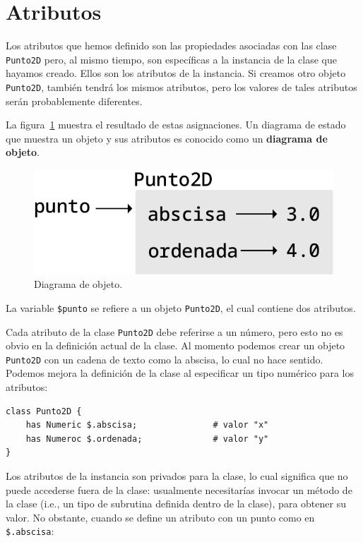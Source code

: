 \section{Atributos}
\label{attributes}

Los atributos que hemos definido son las propiedades asociadas
con las clase {\tt Punto2D} pero, al mismo tiempo, son específicas
a la instancia de la clase que hayamos creado. Ellos son los
atributos de la instancia. Si creamos otro objeto {\tt Punto2D},
también tendrá los mismos atributos, pero los valores de tales
atributos serán probablemente diferentes. 

La figura~\ref{fig.point2d} muestra el resultado de estas asignaciones.
Un diagrama de estado que muestra un objeto y sus atributos es conocido
como un {\bf diagrama de objeto}.

\begin{figure}
\centerline
{\includegraphics[scale=0.8]{figs/point2D.pdf}}
\caption{Diagrama de objeto.}
\label{fig.point2d}
\end{figure}

La variable {\tt \$punto} se refiere a un objeto {\tt Punto2D},
el cual contiene dos atributos. 

Cada atributo de la clase {\tt Punto2D} debe referirse a un 
número, pero esto no es obvio en la definición actual de la clase.
Al momento podemos crear un objeto {\tt Punto2D} con un cadena de texto
como la abscisa, lo cual no hace sentido. Podemos mejora la definición de
la clase al especificar un tipo numérico para los atributos:
%
\begin{lstlisting}
class Punto2D {
	has Numeric $.abscisa;               # valor "x"
	has Numeroc $.ordenada;              # valor "y" 
}
\end{lstlisting}
%
Los atributos de la instancia son privados para la clase,
lo cual significa que no puede accederse fuera de la clase:
usualmente necesitarías invocar un método de la clase (i.e., un
tipo de subrutina definida dentro de la clase), para obtener su
valor. No obstante, cuando se define un atributo con un punto como 
en \verb|$.abscisa|:

